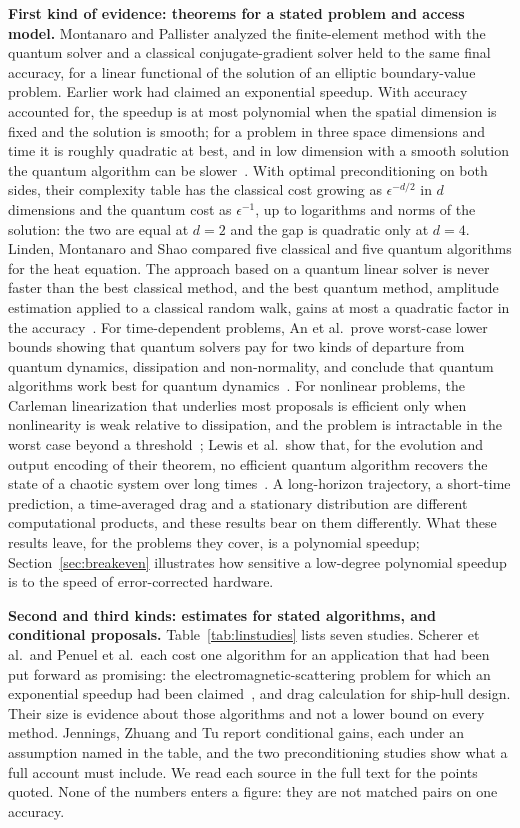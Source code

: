 \documentclass[10pt,a4paper]{article}
\begin{document}
\textbf{First kind of evidence: theorems for a stated problem and access model.} Montanaro and Pallister analyzed the finite-element method with the quantum solver and a classical conjugate-gradient solver held to the same final accuracy, for a linear functional of the solution of an elliptic boundary-value problem. Earlier work had claimed an exponential speedup. With accuracy accounted for, the speedup is at most polynomial when the spatial dimension is fixed and the solution is smooth; for a problem in three space dimensions and time it is roughly quadratic at best, and in low dimension with a smooth solution the quantum algorithm can be slower~\cite{montanaro2016}. With optimal preconditioning on both sides, their complexity table has the classical cost growing as $\epsilon^{-d/2}$ in $d$ dimensions and the quantum cost as $\epsilon^{-1}$, up to logarithms and norms of the solution: the two are equal at $d=2$ and the gap is quadratic only at $d=4$. Linden, Montanaro and Shao compared five classical and five quantum algorithms for the heat equation. The approach based on a quantum linear solver is never faster than the best classical method, and the best quantum method, amplitude estimation applied to a classical random walk, gains at most a quadratic factor in the accuracy~\cite{linden2022}. For time-dependent problems, An et al.\ prove worst-case lower bounds showing that quantum solvers pay for two kinds of departure from quantum dynamics, dissipation and non-normality, and conclude that quantum algorithms work best for quantum dynamics~\cite{an2025}. For nonlinear problems, the Carleman linearization that underlies most proposals is efficient only when nonlinearity is weak relative to dissipation, and the problem is intractable in the worst case beyond a threshold~\cite{liu2021c}; Lewis et al.\ show that, for the evolution and output encoding of their theorem, no efficient quantum algorithm recovers the state of a chaotic system over long times~\cite{lewis2024}. A long-horizon trajectory, a short-time prediction, a time-averaged drag and a stationary distribution are different computational products, and these results bear on them differently. What these results leave, for the problems they cover, is a polynomial speedup; Section~\ref{sec:breakeven} illustrates how sensitive a low-degree polynomial speedup is to the speed of error-corrected hardware.

\textbf{Second and third kinds: estimates for stated algorithms, and conditional proposals.} Table~\ref{tab:linstudies} lists seven studies. Scherer et al.\ and Penuel et al.\ each cost one algorithm for an application that had been put forward as promising: the electromagnetic-scattering problem for which an exponential speedup had been claimed~\cite{clader2013}, and drag calculation for ship-hull design. Their size is evidence about those algorithms and not a lower bound on every method. Jennings, Zhuang and Tu report conditional gains, each under an assumption named in the table, and the two preconditioning studies show what a full account must include. We read each source in the full text for the points quoted. None of the numbers enters a figure: they are not matched pairs on one accuracy.
\end{document}
